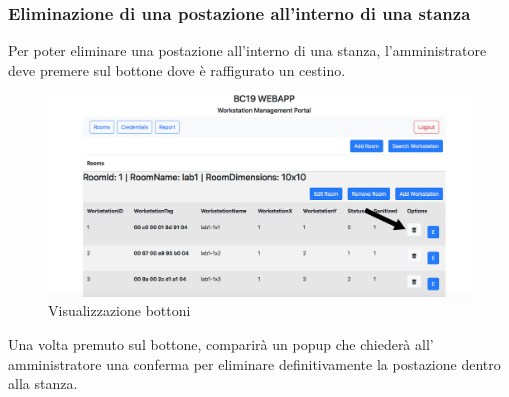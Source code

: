 \subsubsection{Eliminazione di una postazione all'interno di una stanza}
Per poter eliminare una postazione all'interno di una stanza, l'amministratore deve premere sul bottone dove è raffigurato un cestino.
\begin{figure}[H]
	\centering
	\includegraphics[width=15cm]{res/images/bottoneCestinoWorkstation.png}
	\caption{Visualizzazione bottoni}
\end{figure}
Una volta premuto sul bottone, comparirà un popup che chiederà all' amministratore una conferma per eliminare definitivamente la postazione dentro alla stanza.

